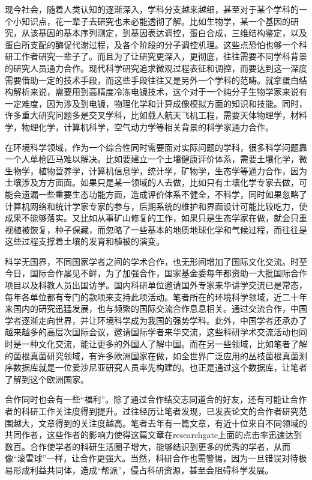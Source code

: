 \documentclass[]{book}
\begin{document}
现今社会，随着人类认知的逐渐深入，学科分支越来越细，甚至对于某个学科的一个小知识点，花一辈子去研究也未必能透彻了解。比如生物学，某一个基因的研究，从该基因的基本序列测定，到基因表达调控，蛋白合成，三维结构鉴定，以及蛋白所支配的酶促代谢过程，及各个阶段的分子调控机理。这些点恐怕也够一个科研工作者研究一辈子了。而且为了让研究更深入，更彻底，往往需要不同学科背景的研究人员通力合作。现代科学研究追求微观过程表征和调控，而要达到这一深度需要借助一定的技术手段，而这些手段往往又是另外一个学科的范畴。就拿蛋白结构解析来说，需要用到高精度冷冻电镜技术，这个对于一个纯分子生物学家来说有一定难度，因为涉及到电镜，物理化学和计算成像模拟方面的知识和技能。同时，许多重大研究问题多是交叉学科，比如载人航天飞机工程，需要天体物理学，材料学，物理化学，计算机科学，空气动力学等相关背景的科学家通力合作。

在环境科学领域，作为一个综合性同时需要面对实际问题的学科，很多科学问题靠一个人单枪匹马难以解决。比如要建立一个土壤健康评价体系，需要土壤化学，微生物学，植物营养学，计算机信息学，统计学，矿物学，生态学等通力合作，因为土壤涉及方方面面。如果只是某一领域的人去做，比如只有土壤化学专家去做，可能会遗漏一些重要生态功能方面，造成评价体系不健全，不科学，同时如果忽略了计算机网络和统计学家专家的参与，后期系统的维护和界面设计可能比较吃力，使成果不能够落实。又比如从事矿山修复的工作，如果只是生态学家在做，就会只重视植被恢复，种子保藏，而忽略了一些基本的地质地球化学和气候过程，而往往是这些过程支撑着土壤的发育和植被的演变。

科学无国界，不同国家学者之间的学术合作，也无形间增加了国际文化交流。时至今日，国际合作屡见不鲜，为了加强合作，国家基金委每年都资助一大批国际合作项目以及科教人员出国访学。国内科研单位邀请国外专家来华讲学交流已是常态，每年各单位都有专门的款项来支持此项活动。笔者所在的环境科学领域，近二十年来国内的研究迅猛发展，也与频繁的国际交流合作息息相关。通过交流合作，中国学者逐渐走向世界，并让环境科学成为我国的强势学科。此外，中国学者还承办了越来越多的高层次国际会议，邀请国际学者来华交流，这些科研学术交流活动也同时是一种文化交流，能让更多的外国人了解中国。而在另一些领域，比如笔者了解的菌根真菌研究领域，有许多欧洲国家在做，如全世界广泛应用的丛枝菌根真菌测序数据库就是一位爱沙尼亚研究人员率先构建的。也正是通过这个数据库，让笔者了解到这个欧洲国家。

合作同时也会有一些``福利''。除了通过合作结交志同道合的好友，还有可能让合作者的科研工作关注度得到提升。过往经历让笔者发现，已发表论文的合作者研究范围越大，文章得到的关注度越高。笔者去年有一篇文章，有近十位来自不同领域的共同作者，这些作者的影响力使得这篇文章在researchgate上面的点击率迅速达到数百。合作使学者的科研生活圈子增大，能够结识到更多的优秀的学者，从而像``滚雪球''一样，让合作更强大。当然，科研合作也需警惕，因为一旦错误对待极易形成利益共同体，造成``帮派''，侵占科研资源，甚至会阻碍科学发展。
\end{document}

